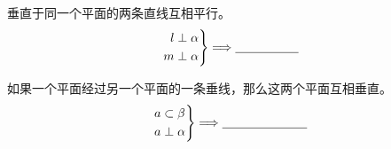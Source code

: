 \documentclass{exam-zh}
\begin{document}
\begin{problem}[points=5]
  \noindent
  \begin{minipage}[t]{\dimexpr\linewidth-55mm-6mm\relax}
    \vspace{0pt}
    垂直于同一个平面的两条直线互相平行。
\[
\left.
\begin{aligned}
l&\perp\alpha\\
m&\perp\alpha
\end{aligned}
\right\}
\Longrightarrow
\underline{\hspace{18mm}}
\]


  \end{minipage}\hfill
  \begin{diagramcoltikz}{55mm}{}
  }
  \end{diagramcoltikz}
  \par\medskip
\end{problem}



\begin{problem}[points=5]
  \noindent
  \begin{minipage}[t]{\dimexpr\linewidth-55mm-6mm\relax}
    \vspace{0pt}
    如果一个平面经过另一个平面的一条垂线，那么这两个平面互相垂直。
\[
\left.
\begin{aligned}
a&\subset\beta\\
a&\perp\alpha
\end{aligned}
\right\}
\Longrightarrow
\underline{\hspace{24mm}}
\]


  \end{minipage}\hfill
  \begin{diagramcoltikz}{55mm}{}
  }
  \end{diagramcoltikz}
  \par\medskip
\end{problem}


\end{document}
